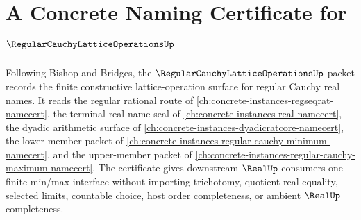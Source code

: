 \chapter{A Concrete Naming Certificate for $\RegularCauchyLatticeOperationsUp$}
\label{ch:concrete-instances-regular-cauchy-lattice-operations-namecert}

Following Bishop and Bridges, the $\RegularCauchyLatticeOperationsUp$ packet records the finite constructive lattice-operation surface for regular Cauchy real names. It reads the regular rational route of \autoref{ch:concrete-instances-regseqrat-namecert}, the terminal real-name seal of \autoref{ch:concrete-instances-real-namecert}, the dyadic arithmetic surface of \autoref{ch:concrete-instances-dyadicratcore-namecert}, the lower-member packet of \autoref{ch:concrete-instances-regular-cauchy-minimum-namecert}, and the upper-member packet of \autoref{ch:concrete-instances-regular-cauchy-maximum-namecert}. The certificate gives downstream $\RealUp$ consumers one finite min/max interface without importing trichotomy, quotient real equality, selected limits, countable choice, host order completeness, or ambient $\RealUp$ completeness.

